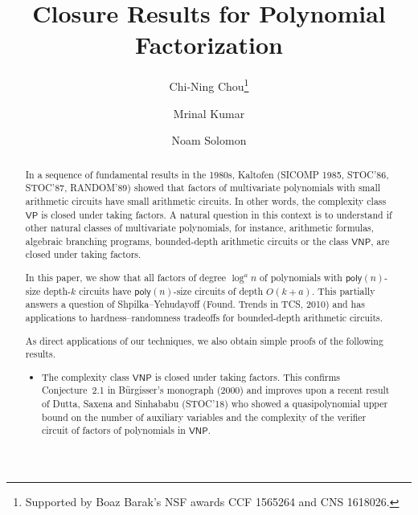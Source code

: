 \documentclass{toc}
\newcommand{\ComplexityFont}[1]{{\ensuremath{\mathsf{#1}}}}
\newcommand{\func}[1]{{\ensuremath{\mathsf{#1}}}}
\newcommand{\VNP}{\ComplexityFont{VNP}}
\newcommand{\VP}{\ComplexityFont{VP}}
\newcommand{\poly}{\func{poly}}
\begin{document}
\begin{frontmatter} %
  
%
%

%
%

\title{Closure Results for Polynomial Factorization}
%

%
%
%
%
%
%
%
%
%
%
%
%


%
%
%
%

%

\author[chou]{Chi-Ning Chou\thanks{Supported by Boaz Barak's NSF awards CCF 1565264 and CNS 1618026.}}
\author[kumar]{Mrinal Kumar}
\author[solomon]{Noam Solomon}

%
%
%
%

%
%
%
%
%
%




\begin{abstract}
In a sequence of  fundamental results in the 1980s,
Kaltofen (SICOMP 1985, STOC'86, STOC'87, RANDOM'89) 
showed that factors of multivariate polynomials with small
arithmetic circuits have small arithmetic circuits. In other
words, the complexity class $\VP$ is closed under taking factors.
A natural question in this context is to understand if other
natural classes of multivariate polynomials, for instance,
arithmetic formulas, algebraic branching programs, bounded-depth 
arithmetic circuits or the class $\VNP$, are closed under taking
factors. 

In this paper, we show that all factors of degree %
$\log^a n$
of polynomials with
%
$\poly(n)$-size    %
depth-$k$   
circuits have
%
$\poly(n)$-size    %
circuits of depth %
$O(k + a)$.
This partially answers a  question of Shpilka--Yehudayoff
(Found. Trends in TCS, 2010)  and has applications to
hardness--randomness tradeoffs for bounded-depth arithmetic circuits.  

%

%
%
%
%
%
%
%
%
%
%
%
%
%
%
%
%
%
%
%
%
%
%
%
%
%
%
%
%
%
%
%
%
%
%
%

As direct applications of our techniques, we also obtain
simple proofs of the following results.
\begin{itemize}
\item The complexity class $\VNP$ is closed under taking factors. This
confirms
%
Conjecture~2.1 in B{\"u}rgisser's monograph (2000)   %
and improves upon a recent result of Dutta, Saxena and
%
Sinhababu (STOC'18)        %
who showed a quasipolynomial upper bound on the number of auxiliary variables and the complexity of the verifier circuit of factors of polynomials in $\VNP$. 
	

\end{itemize}
\end{abstract}
\end{frontmatter}
\end{document}
